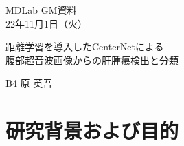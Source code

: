 \documentclass{ujarticle}
\begin{document}
    \begin{flushright}
        MDLab GM資料\\
        22年11月1日（火）
    \end{flushright}

    \begin{center}
        {\Large	距離学習を導入したCenterNetによる\\腹部超音波画像からの肝腫瘍検出と分類}
    \end{center}

    \begin{flushright}
        {\large B4 原 英吾}\\
    \end{flushright}

    \section{研究背景および目的}
\end{document}
